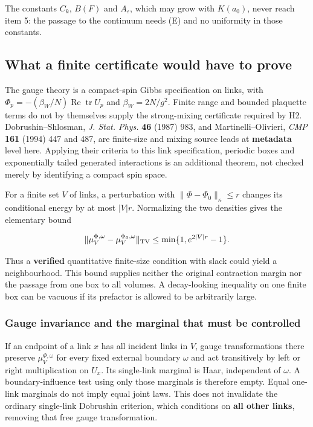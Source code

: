 \documentclass[11pt,a4paper]{article}
\begin{document}
The constants \(C_k\), \(B(F)\) and \(A_\varepsilon\), which may grow
with \(K(a_0)\), never reach item 5: the passage to the continuum needs
(E) and no uniformity in those constants.

\hypertarget{what-a-finite-certificate-would-have-to-prove}{%
\subsection{What a finite certificate would have to
prove}\label{what-a-finite-certificate-would-have-to-prove}}

The gauge theory is a compact-spin Gibbs specification on links, with
\(\Phi_p=-(\beta_W/N)\operatorname{Re}\operatorname{tr}U_p\) and
\(\beta_W=2N/g^2\). Finite range and bounded plaquette terms do not by
themselves supply the strong-mixing certificate required by H2.
Dobrushin--Shlosman, \emph{J. Stat. Phys.} \textbf{46} (1987) 983, and
Martinelli--Olivieri, \emph{CMP} \textbf{161} (1994) 447 and 487, are
finite-size and mixing source leads at \textbf{metadata} level here.
Applying their criteria to this link specification, periodic boxes and
exponentially tailed generated interactions is an additional theorem,
not checked merely by identifying a compact spin space.

For a finite set \(V\) of links, a perturbation with
\(\|\Phi-\Phi_0\|_\kappa\le r\) changes its conditional energy by at
most \(|V|r\). Normalizing the two densities gives the elementary bound

\[\|\mu_V^{\Phi,\omega}-\mu_V^{\Phi_0,\omega}\|_{\rm TV}
 \le\min\{1,e^{2|V|r}-1\}.\]

Thus a \textbf{verified} quantitative finite-size condition with slack
could yield a neighbourhood. This bound supplies neither the original
contraction margin nor the passage from one box to all volumes. A
decay-looking inequality on one finite box can be vacuous if its
prefactor is allowed to be arbitrarily large.

\hypertarget{gauge-invariance-and-the-marginal-that-must-be-controlled}{%
\subsubsection{Gauge invariance and the marginal that must be
controlled}\label{gauge-invariance-and-the-marginal-that-must-be-controlled}}

If an endpoint of a link \(x\) has all incident links in \(V\), gauge
transformations there preserve \(\mu_V^{\Phi,\omega}\) for every fixed
external boundary \(\omega\) and act transitively by left or right
multiplication on \(U_x\). Its single-link marginal is Haar, independent
of \(\omega\). A boundary-influence test using only those marginals is
therefore empty. Equal one-link marginals do not imply equal joint laws.
This does not invalidate the ordinary single-link Dobrushin criterion,
which conditions on \textbf{all other links}, removing that free gauge
transformation.
\end{document}
